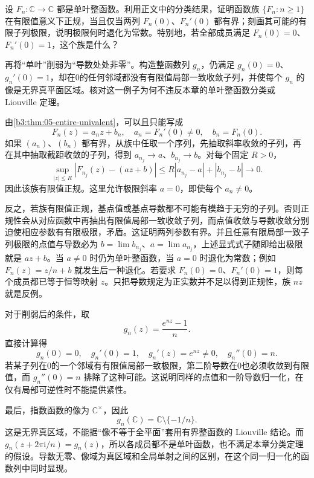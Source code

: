 \begin{exercise}\label{b3:ex:05-8}
设 \(F_n:\mathbb C\rightarrow\mathbb C\) 都是单叶整函数。利用正文中的分类结果，证明函数族 \(\{F_n:n\ge1\}\) 在有限值意义下正规，当且仅当两列 \(F_n(0)\)、\(F_n'(0)\) 都有界；刻画其可能的有限子列极限，说明极限何时退化为常数。特别地，若全部成员满足 \(F_n(0)=0\)、\(F_n'(0)=1\)，这个族是什么？

再将“单叶”削弱为“导数处处非零”。构造整函数列 \(g_n\)，仍满足 \(g_n(0)=0\)、\(g_n'(0)=1\)，却在0的任何邻域都没有有限值局部一致收敛子列，并使每个 \(g_n\) 的像是无界真平面区域。核对这一例子为何不违反本章的单叶整函数分类或 Liouville 定理。
\end{exercise}
\begin{solution}
由\cref{b3:thm:05-entire-univalent}，可以且只能写成
\[
 F_n(z)=a_nz+b_n,\quad
 a_n=F_n'(0)\ne0,\quad b_n=F_n(0).
\]
如果 \((a_n)\)、\((b_n)\) 都有界，从族中任取一个序列，先抽取斜率收敛的子列，再在其中抽取截距收敛的子列，得到
\(a_{n_j}\to a\)、\(b_{n_j}\to b\)。对每个固定 \(R>0\)，
\[
 \sup_{|z|\le R}|F_{n_j}(z)-(az+b)|
 \le R|a_{n_j}-a|+|b_{n_j}-b|\longrightarrow0.
\]
因此该族有限值正规。这里允许极限斜率 \(a=0\)，即使每个 \(a_n\ne0\)。

反之，若族有限值正规，基点值或基点导数都不可能有模趋于无穷的子列。否则正规性会从对应函数中再抽出有限值局部一致收敛子列，而点值收敛与导数收敛分别迫使相应参数有有限极限，矛盾。这证明两列参数有界。并且任意有限局部一致子列极限的点值与导数必为 \(b=\lim b_{n_j}\)、\(a=\lim a_{n_j}\)，上述显式式子随即给出极限就是 \(az+b\)。当 \(a\ne0\) 时仍为单叶整函数，当 \(a=0\) 时退化为常数；例如 \(F_n(z)=z/n+b\) 就发生后一种退化。若要求 \(F_n(0)=0\)、\(F_n'(0)=1\)，则每个成员都已等于恒等映射 \(z\)。只把导数规定为正实数并不足以得到正规性，族 \(nz\) 就是反例。

对于削弱后的条件，取
\[
 g_n(z)=\frac{e^{nz}-1}{n}.
\]
直接计算得
\[
 g_n(0)=0,\quad g_n'(0)=1,\quad
 g_n'(z)=e^{nz}\ne0,\quad g_n''(0)=n.
\]
若某子列在0的一个邻域有有限值局部一致极限，第二阶导数在0也必须收敛到有限值，而 \(g_n''(0)=n\) 排除了这种可能。这说明同样的点值和一阶导数归一化，在仅有局部可逆性时不能提供紧性。

最后，指数函数的像为 \(\mathbb C^\times\)，因此
\[
 g_n(\mathbb C)=\mathbb C\setminus\{-1/n\}.
\]
这是无界真区域，不能据“像不等于全平面”套用有界整函数的 Liouville 结论。而 \(g_n(z+2\pi\mathrm{i}/n)=g_n(z)\)，所以各成员都不是单叶函数，也不满足本章分类定理的假设。导数无零、像域为真区域和全局单射之间的区别，在这个同一归一化的函数列中同时显现。
\end{solution}
